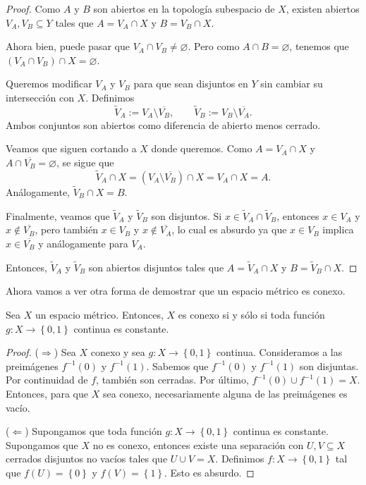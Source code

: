 \begin{proof}
	Como $A$ y $B$ son abiertos en la topología subespacio de $X$, existen abiertos $V_A, V_B \subseteq Y$ tales que $A = V_A \cap X$ y $B = V_B \cap X$.

	Ahora bien, puede pasar que $V_A \cap V_B \neq \varnothing$. Pero como $A \cap B = \varnothing$, tenemos que $(V_A \cap V_B) \cap X = \varnothing$.

	Queremos modificar $V_A$ y $V_B$ para que sean disjuntos en $Y$ sin cambiar su intersección con $X$. Definimos
	\begin{equation*}
		\widetilde{V}_A := V_A \setminus \overline{V_B}, \qquad \widetilde{V}_B := V_B \setminus \overline{V_A}.
	\end{equation*}
	Ambos conjuntos son abiertos como diferencia de abierto menos cerrado.

	Veamos que siguen cortando a $X$ donde queremos. Como $A = V_A \cap X$ y $A \cap \overline{V_B} = \varnothing$, se sigue que
	\begin{equation*}
		\widetilde{V}_A \cap X = (V_A \setminus \overline{V_B}) \cap X = V_A \cap X = A.
	\end{equation*}
	Análogamente, $\widetilde{V}_B \cap X = B$.

	Finalmente, veamos que $\widetilde{V}_A$ y $\widetilde{V}_B$ son disjuntos. Si $x \in \widetilde{V}_A \cap \widetilde{V}_B$, entonces $x \in V_A$ y $x \notin \overline{V_B}$, pero también $x \in V_B$ y $x \notin \overline{V_A}$, lo cual es absurdo ya que $x \in V_B$ implica $x \in \overline{V_B}$ y análogamente para $V_A$.

	Entonces, $\widetilde{V}_A$ y $\widetilde{V}_B$ son abiertos disjuntos tales que $A = \widetilde{V}_A \cap X$ y $B = \widetilde{V}_B \cap X$.
\end{proof}

Ahora vamos a ver otra forma de demostrar que un espacio métrico es conexo.

\begin{proposition}
	Sea $X$ un espacio métrico. Entonces, $X$ es conexo si y sólo si toda función $g : X \to \left\{ 0, 1 \right\}$ continua es constante.
\end{proposition}

\begin{proof}
	($\Rightarrow$) Sea $X$ conexo y sea $g : X \to \left\{ 0, 1 \right\}$ continua. Consideramos a las preimágenes $f^{-1}(0)$ y $f^{-1}(1)$. Sabemos que $f^{-1}(0)$ y $f^{-1}(1)$ son disjuntas. Por continuidad de $f$, también son cerradas. Por último, $f^{-1}(0) \cup f^{-1}(1) = X$. Entonces, para que $X$ sea conexo, necesariamente alguna de las preimágenes es vacío.

	($\Leftarrow$) Supongamos que toda función $g : X \to \left\{ 0, 1 \right\}$ continua es constante. Supongamos que $X$ no es conexo, entonces existe una separación con $U, V \subseteq X$ cerrados disjuntos no vacíos tales que $U \cup V = X$. Definimos $f : X \to \left\{ 0, 1 \right\}$ tal que $f(U) = \left\{ 0 \right\}$ y $f(V) = \left\{ 1 \right\}$. Esto es absurdo.
\end{proof}

